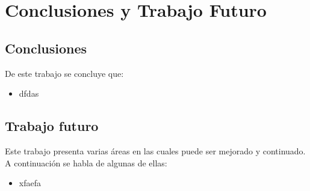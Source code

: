 \chapter{Conclusiones y Trabajo Futuro} \label{chap:conclusiones}


\section{Conclusiones} \label{sect:conclusiones}

De este trabajo se concluye que:

\begin{itemize}
\item{dfdas}


\end{itemize}


\section{Trabajo futuro} \label{sect:trabajo_futuro}

Este trabajo presenta varias áreas en las cuales puede ser mejorado y continuado. A continuación se habla de algunas de ellas:

\begin{itemize}
\item{xfaefa}

\end{itemize}










